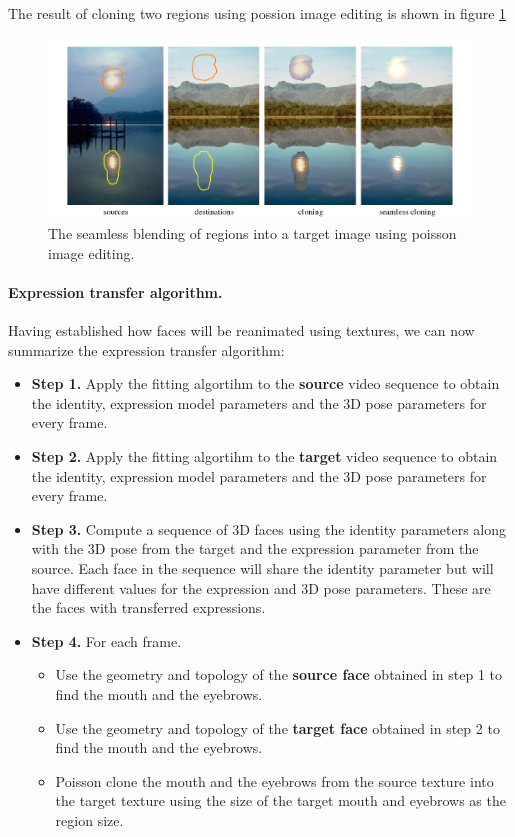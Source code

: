 \documentclass[11pt,a4paper]{report}
\begin{document}
The result of cloning two regions using possion image editing is shown in figure \ref{fg:poisson}
\begin{figure}[H]
\begin{centering}
\includegraphics[scale=0.55]{images/cloning.png}
\par\end{centering}

\caption{The seamless blending of regions into a target image using poisson
  image editing.}
\label{fg:poisson}

\end{figure}

\paragraph{Expression transfer algorithm.}Having established how faces will be reanimated using textures, we can now
summarize the expression transfer algorithm:
\begin{itemize}
\item \textbf{Step 1.} Apply the fitting algortihm to the \textbf{source} video sequence
  to obtain the identity, expression model parameters and the 3D pose parameters
  for every frame.
\item \textbf{Step 2.} Apply the fitting algortihm to the \textbf{target} video sequence
  to obtain the identity, expression model parameters and the 3D pose
  parameters for every frame.
\item \textbf{Step 3.} Compute a sequence of 3D faces using the identity
  parameters along with the 3D pose from the target and the expression parameter
  from the source. Each face in the sequence will share the identity parameter
  but will have different values for the expression and 3D pose
  parameters. These are the faces with transferred expressions.
\item \textbf{Step 4.} For each frame.
\begin{itemize}
\item[\textbullet] Use the geometry and topology of the \textbf{source face} obtained in step 1 to
  find the mouth and the eyebrows.
\item[\textbullet] Use the geometry and topology of the \textbf{target face} obtained in step 2 to
  find the mouth and the eyebrows.
\item[\textbullet] Poisson clone the mouth and the eyebrows from the source texture into
  the target texture using the size of the target mouth and eyebrows as the
  region size.
\end{itemize}
\end{itemize}
\end{document}
